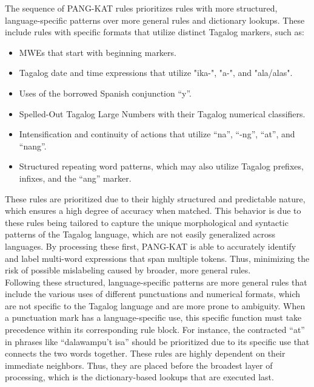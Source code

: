 \documentclass[journal]{./IEEE/IEEEtran}
\begin{document}
The sequence of PANG-KAT rules prioritizes rules with more structured, language-specific patterns over more general rules and dictionary lookups. These include rules with specific formats that utilize distinct Tagalog markers, such as: \\ 

\begin{itemize}
    \item MWEs that start with beginning markers. \\
    \item Tagalog date and time expressions that utilize "ika-", "a-", and "ala/alas". \\
    \item Uses of the borrowed Spanish conjunction “y”. \\
    \item Spelled-Out Tagalog Large Numbers with their Tagalog numerical classifiers. \\
    \item Intensification and continuity of actions that utilize “na”, “-ng”, “at”, and “nang”. \\
    \item Structured repeating word patterns, which may also utilize Tagalog prefixes, infixes, and the “ang” marker. \\
\end{itemize}

These rules are prioritized due to their highly structured and predictable nature, which ensures a high degree of accuracy when matched. This behavior is due to these rules being tailored to capture the unique morphological and syntactic patterns of the Tagalog language, which are not easily generalized across languages. By processing these first, PANG-KAT is able to accurately identify and label multi-word expressions that span multiple tokens. Thus, minimizing the risk of possible mislabeling caused by broader, more general rules. \\

Following these structured, language-specific patterns are more general rules that include the various uses of different punctuations and numerical formats, which are not specific to the Tagalog language and are more prone to ambiguity. When a punctuation mark has a language-specific use, this specific function must take precedence within its corresponding rule block. For instance, the contracted “at” in phrases like “dalawampu’t isa” should be prioritized due to its specific use that connects the two words together. These rules are highly dependent on their immediate neighbors. Thus, they are placed before the broadest layer of processing, which is the dictionary-based lookups that are executed last. \\
\end{document}
